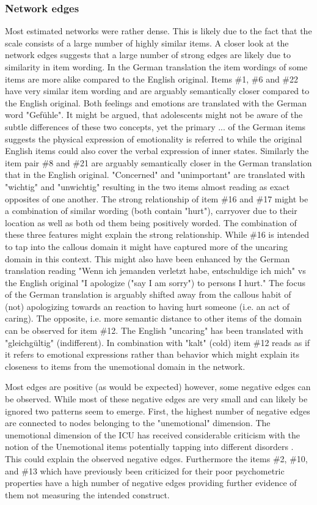 \subsubsection{Network edges}
Most estimated networks were rather dense.
This is likely due to the fact that the scale consists of a large number of highly similar items.
A closer look at the network edges suggests that a large number of strong edges are likely due to similarity in item wording. 
In the German translation the item wordings of some items are more alike compared to the English original.
Items \#1, \#6 and \#22 have very similar item wording and are arguably semantically closer compared to the English original.
Both feelings and emotions are translated with the German word "Gefühle". 
It might be argued, that adolescents might not be aware of the subtle differences of these two concepts, yet the primary 
... of the German items suggests the physical expression of emotionality is referred to while the original English items could also cover the verbal expression of inner states.
Similarly the item pair \#8 and \#21 are arguably semantically closer in the German translation that in the English original. 
"Concerned" and "unimportant" are translated with "wichtig" and "unwichtig" resulting in the two items almost reading as exact opposites of one another.
The strong relationship of item \#16 and \#17 might be a combination of similar wording (both contain "hurt"), carryover due to their location as well as both od them being positively worded.
The combination of these three features might explain the strong relationship. While \#16 is intended to tap into the callous domain it might have captured more of the uncaring domain in this context.
This might also have been enhanced by the German translation reading "Wenn ich jemanden verletzt habe, entschuldige ich mich" vs the English original "I apologize ("say I am sorry") to persons I hurt."
The focus of the German translation is arguably shifted away from the callous habit of (not) apologizing towards an reaction to having hurt someone (i.e. an act of caring).
The opposite, i.e. more semantic distance to other items of the domain can be observed for item \#12. The English "uncaring" has been translated with "gleichgültig" (indifferent). 
In combination with "kalt" (cold) item \#12 reads as if it refers to emotional expressions rather than behavior which might explain its closeness to items from the unemotional domain in the network.

Most edges are positive (as would be expected) however, some negative edges can be observed.
While most of these negative edges are very small and can likely be ignored two patterns seem to emerge.
First, the highest number of negative edges are connected to nodes belonging to the "unemotional" dimension.
The unemotional dimension of the ICU has received considerable criticism with the notion of the Unemotional items potentially tapping into different disorders \parencite{cardinale_reliability_2017}. This could explain the observed negative edges.
Furthermore the items \#2, \#10, and \#13 which have previously been criticized for their poor psychometric properties have a high number of negative edges providing further evidence of them not measuring the intended construct. 

